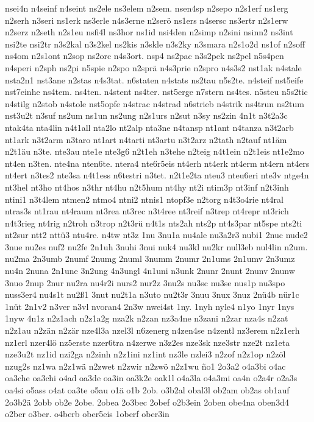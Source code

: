 {nsei4n
n4seinf
n4seint
ns2ele
ns3elem
n2sem.
nsen4sp
n2sepo
n2s1erf
ns1erg
n2serh
n3seri
ns1erk
ns3erle
n4s3erne
n2serö
ns1ers
n4sersc
ns3ertr
n2s1erw
n2serz
n2seth
n2s1eu
nsfi4l
ns3hor
ns1id
nsi4den
n2simp
n2sini
nsinn2
ns3int
nsi2te
nsi2tr
n3s2kal
n3s2kel
ns2kis
n3skle
n3s2ky
n3smara
n2s1o2d
ns1of
n2soff
ns4om
n2s1ont
n2sop
ns2orc
n4s3ort.
nsp4
ns2pac
n3s2pek
ns2pel
n5s4pen
n4speri
n2sph
ns2pi
n5spie
n2spo
n2sprä
n4s3prie
n2spro
n4s3s2
nst1ak
n4stale
nsta2n1
nst3ane
n2stas
n4s3tat.
n6staten
n4stats
ns2tau
n5s2te.
n4steif
nst5eife
nst7einhe
ns4tem.
ns4ten.
n4stent
ns4ter.
nst5erge
n7stern
ns4tes.
n5steu
n5s2tic
n4stilg
n2stob
n4stole
nst5opfe
n4strac
n4strad
n6strieb
n4strik
ns4trun
ns2tum
nst3u2t
n3suf
ns2um
ns1un
ns2ung
n2s1urs
n2sut
n3sy
ns2zin
4n1t
n3t2a3c
ntak4ta
nta4lin
n4t1all
nta2lo
nt2alp
nta3ne
n4tansp
nt1ant
n4tanza
n3t2arb
nt1ark
n3t2arm
n3taro
nt1art
n4tarti
nt3artu
n3t2arz
n2tath
n2tauf
nt1äm
n2t1äu
n3te.
nte3au
nte1e
nte3g6
n2t1eh
n3tehe
n2teig
n4t1ein
n2t1eis
nt1e2mo
nt4en
n3ten.
nte4na
nten6te.
ntera4
nte6r5eis
nt4erh
nt4erk
nt4erm
nt4ern
nt4ers
nt4ert
n3tes2
nte3sa
n4t1ess
n6testri
n3tet.
n2t1e2ta
nteu3
nteu6eri
nte3v
ntge4n
nt3hel
nt3ho
nt4hos
n3thr
nt4hu
n2t5hum
nt4hy
nt2i
ntim3p
nt3inf
n2t3inh
ntini1
n3t4lem
ntmen2
ntmo4
ntni2
ntnis1
ntopf3e
n2torg
n4t3o4rie
nt4ral
ntras3s
nt1rau
nt4raum
nt3rea
nt3rec
n3t4ree
nt3reif
n3trep
nt4repr
nt3rich
n4t3rieg
nt4rig
n2troh
n3trop
n2t3rü
n4t1s
nts2ah
nts2p
nt4s3par
nt5spe
nts2ti
nt2sur
ntt2
nttü3
ntu4re.
n4tw
nt3z
1nu
3nu1a
nu4ale
nu3a2r3
nubi1
2nuc
nude2
3nue
nu2es
nuf2
nu2fe
2n1uh
3nuhi
3nui
nuk4
nu3kl
nu2kr
null3eb
nul4lin
n2um.
nu2ma
2n3umb
2numf
2numg
2numl
3numm
2numr
2n1ums
2n1umv
2n3umz
nu4n
2nuna
2n1une
3n2ung
4n3ungl
4n1uni
n3unk
2nunr
2nunt
2nunv
2nunw
3nuo
2nup
2nur
nu2ra
nu4r2i
nurs2
nur2z
3nu2s
nu3sc
nu3se
nus1p
nu3spo
nuss3er4
nu4s1t
nu2ß1
3nut
nu2t1a
n3uto
nu2t3r
3nuu
3nux
3nuz
2nü4b
nür1c
1nüt
2n1v2
n3ver
n3vl
nvoran4
2n3w
nwei4st
1ny.
1nyh
nyle4
n1yo
1nyr
1nys
1nyw
4n1z
n2z1ach
n2z1a2g
nza2k
n2zan
nz3a4ne
n3zani
n2zar
nza4s
n2zat
n2z1au
n2zän
n2zär
nze4l3a
nzel3l
n6zenerg
n4zen4se
n4zentl
nz3erem
n2z1erh
nz1erl
nzer4lö
nz5erste
nzer6tra
n4zerwe
n3z2es
nze3sk
nze3str
nze2t
nz1eta
nze3u2t
nz1id
nzi2ga
n2zinh
n2z1ini
nz1int
nz3le
nzlei3
n2zof
n2z1op
n2zöl
nzug2s
nz1wa
n2z1wä
n2zwet
n2zwir
n2zwö
n2z1wu
ño1
2o3a2
o4a3bi
o4ac
oa3che
oa3chi
o4ad
oa3de
oa3in
oa3k2e
oak1l
o4a3la
o4a3mi
oa4n
o2a4r
o2a3s
oa4si
o5ass
o4at
oa3te
o5au
o1ä
o1b
2ob.
o3b2al
obal3l
ob2am
ob2as
ob1auf
2o3b2ä
2obb
ob2e
2obe.
2obea
2o3bec
2obef
o2b3ein
2oben
obe4na
oben3d4
o2ber
o3ber.
o4berb
ober5eis
1oberf
ober3in
}
